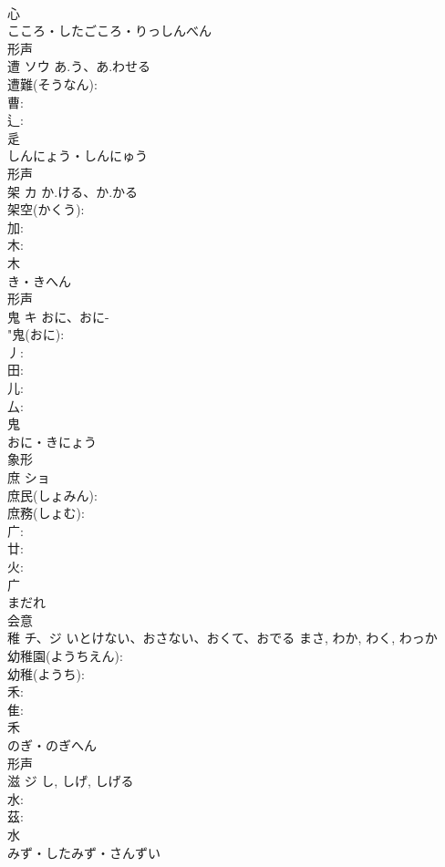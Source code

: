 \documentclass[8pt]{extreport}
\begin{document}
\begin{CJK}{UTF8}{min}
\\	心	
\\	こころ・したごころ・りっしんべん	
\\	形声 
\\	遭	ソウ	あ.う、あ.わせる		
\\	遭難(そうなん): 
\\	曹: 
\\	辶: 
\\	辵	
\\	しんにょう・しんにゅう	
\\	形声 
\\	架	カ	か.ける、か.かる		
\\	架空(かくう): 
\\	加: 
\\	木: 
\\	木	
\\	き・きへん	
\\	形声 
\\	鬼	キ	おに、おに-		
\\	"鬼(おに): 
\\	丿: 
\\	田: 
\\	儿: 
\\	厶: 
\\	鬼	
\\	おに・きにょう	
\\	象形 
\\	庶	ショ			
\\	庶民(しょみん): 
\\	庶務(しょむ): 
\\	广: 
\\	廿: 
\\	火: 
\\	广	
\\	まだれ	
\\	会意 
\\	稚	チ、ジ	いとけない、おさない、おくて、おでる	まさ, わか, わく, わっか	
\\	幼稚園(ようちえん): 
\\	幼稚(ようち): 
\\	禾: 
\\	隹: 
\\	禾	
\\	のぎ・のぎへん	
\\	形声 
\\	滋	ジ		し, しげ, しげる	
\\	水: 
\\	茲: 
\\	水	
\\	みず・したみず・さんずい	

\end{CJK}
\end{document}
